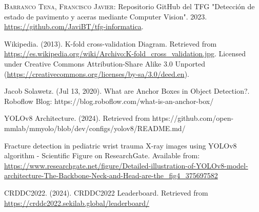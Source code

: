 \begin{thebibliography}{10}
        \textsc{Barranco Tena, Francisco Javier}:
        Repositorio GitHub del TFG "Detección de estado de pavimento y aceras mediante Computer Vision".
        2023.
        \url{https://github.com/JaviBT/tfg-informatica}.

        Wikipedia. (2013). K-fold cross-validation Diagram.
        Retrieved from  \url{https://es.wikipedia.org/wiki/Archivo:K-fold_cross_validation.jpg}.
        Licensed under Creative Commons Attribution-Share Alike 3.0 Unported (\url{https://creativecommons.org/licenses/by-sa/3.0/deed.en}).


    



    


    

        Jacob Solawetz. (Jul 13, 2020). What are Anchor Boxes in Object Detection?. Roboflow Blog: https://blog.roboflow.com/what-is-an-anchor-box/

        
    

        YOLOv8 Architecture. (2024). Retrieved from https://github.com/open-mmlab/mmyolo/blob/dev/configs/yolov8/README.md/

        Fracture detection in pediatric wrist trauma X-ray images using YOLOv8 algorithm - Scientific Figure on ResearchGate. Available from: \url{https://www.researchgate.net/figure/Detailed-illustration-of-YOLOv8-model-architecture-The-Backbone-Neck-and-Head-are-the_fig4_375697582 }

        CRDDC2022. (2024). CRDDC2022 Leaderboard.
        Retrieved from \url{https://crddc2022.sekilab.global/leaderboard/}

  \end{thebibliography}
  